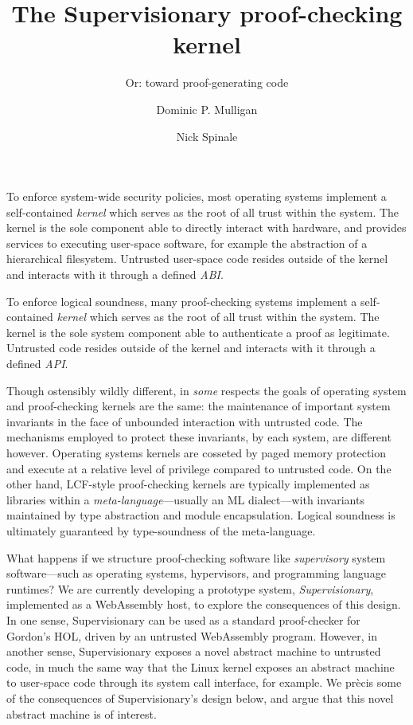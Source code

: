 \documentclass[sigplan, review]{acmart}
\title{The Supervisionary proof-checking kernel}
\subtitle{Or: toward proof-generating code}
\author{Dominic P. Mulligan}
\affiliation{
  \institution{Systems Research Group, Arm Research}
  \streetaddress{Fulbourn Road}
  \city{Cambridge}
  \country{United Kingdom}
}
\author{Nick Spinale}
\affiliation{
  \institution{Systems Research Group, Arm Research}
  \streetaddress{Fulbourn Road}
  \city{Cambridge}
  \country{United Kingdom}
}
\begin{document}
\maketitle

To enforce system-wide security policies, most operating systems implement a self-contained \emph{kernel} which serves as the root of all trust within the system.
The kernel is the sole component able to directly interact with hardware, and provides services to executing user-space software, for example the abstraction of a hierarchical filesystem.
Untrusted user-space code resides outside of the kernel and interacts with it through a defined \emph{ABI}.

To enforce logical soundness, many proof-checking systems implement a self-contained \emph{kernel} which serves as the root of all trust within the system.
The kernel is the sole system component able to authenticate a proof as legitimate.
Untrusted code resides outside of the kernel and interacts with it through a defined \emph{API}.

Though ostensibly wildly different, in \emph{some} respects the goals of operating system and proof-checking kernels are the same: the maintenance of important system invariants in the face of unbounded interaction with untrusted code.
The mechanisms employed to protect these invariants, by each system, are different however.
Operating systems kernels are cosseted by paged memory protection and execute at a relative level of privilege compared to untrusted code.
On the other hand, LCF-style proof-checking kernels are typically implemented as libraries within a \emph{meta-language}---usually an ML dialect---with invariants maintained by type abstraction and module encapsulation.
Logical soundness is ultimately guaranteed by type-soundness of the meta-language.

What happens if we structure proof-checking software like \emph{supervisory} system software---such as operating systems, hypervisors, and programming language runtimes?
We are currently developing a prototype system, \emph{Supervisionary}, implemented as a WebAssembly host, to explore the consequences of this design.
In one sense, Supervisionary can be used as a standard proof-checker for Gordon's HOL, driven by an untrusted WebAssembly program.
However, in another sense, Supervisionary exposes a novel abstract machine to untrusted code, in much the same way that the Linux kernel exposes an abstract machine to user-space code through its system call interface, for example.
We pr\`{e}cis some of the consequences of Supervisionary's design below, and argue that this novel abstract machine is of interest.
\end{document}
